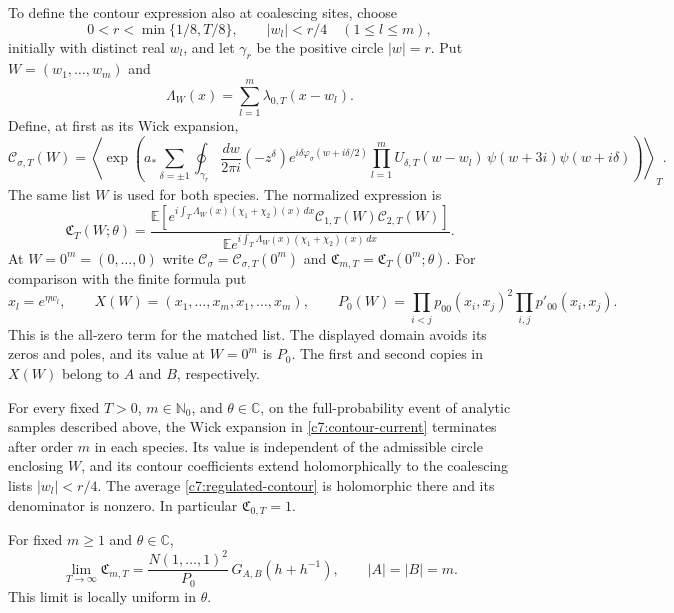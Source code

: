 To define the contour expression also at coalescing sites, choose
\[
0<r<\min\{1/8,T/8\},\qquad |w_l|<r/4\quad(1\le l\le m),
\]
initially with distinct real $w_l$, and let $\gamma_r$ be the positive circle $|w|=r$. Put $W=(w_1,\ldots,w_m)$ and
\[
\Lambda_W(x)=\sum_{l=1}^m\lambda_{0,T}(x-w_l).
\]
Define, at first as its Wick expansion,
\begin{equation}\label{c7:contour-current}
\mathcal C_{\sigma,T}(W)=
\left\langle\exp\left(
a_*\sum_{\delta=\pm1}\oint_{\gamma_r}\frac{dw}{2\pi i}
 (-z^\delta)e^{i\delta\varphi_\sigma(w+i\delta/2)}
 \prod_{l=1}^m U_{\delta,T}(w-w_l)\,
 \psi(w+3i)\psi(w+i\delta)\right)\right\rangle_T .
\end{equation}
The same list $W$ is used for both species. The normalized expression is
\begin{equation}\label{c7:regulated-contour}
\mathfrak C_T(W;\theta)=
\frac{\mathbb E\!\left[
 e^{i\int_T\Lambda_W(x)(\chi_1+\chi_2)(x)\,dx}
 \mathcal C_{1,T}(W)\mathcal C_{2,T}(W)\right]}
{\mathbb E e^{i\int_T\Lambda_W(x)(\chi_1+\chi_2)(x)\,dx}}.
\end{equation}
At $W=0^m=(0,\ldots,0)$ write $\mathcal C_\sigma=\mathcal C_{\sigma,T}(0^m)$ and $\mathfrak C_{m,T}=\mathfrak C_T(0^m;\theta)$.
For comparison with the finite formula put
\[
x_l=e^{\eta w_l},\qquad
X(W)=(x_1,\ldots,x_m,x_1,\ldots,x_m),\qquad
P_0(W)=\prod_{i<j}p_{00}(x_i,x_j)^2
       \prod_{i,j}p'_{00}(x_i,x_j).
\]
This is the all-zero term for the matched list. The displayed domain avoids its zeros and poles, and its value at $W=0^m$ is $P_0$.
The first and second copies in $X(W)$ belong to $A$ and $B$, respectively.

\begin{proposition}\label{c7:regulated-pfaffian}
For every fixed $T>0$, $m\in\mathbb N_0$, and $\theta\in\mathbb C$, on the full-probability event of analytic samples described above, the Wick expansion in \eqref{c7:contour-current} terminates after order $m$ in each species. Its value is independent of the admissible circle enclosing $W$, and its contour coefficients extend holomorphically to the coalescing lists $|w_l|<r/4$. The average \eqref{c7:regulated-contour} is holomorphic there and its denominator is nonzero. In particular $\mathfrak C_{0,T}=1$.

For fixed $m\ge1$ and $\theta\in\mathbb C$,
\begin{equation}\label{c7:regulated-limit}
\lim_{T\longrightarrow\infty}\mathfrak C_{m,T}
=\frac{N(1,\ldots,1)^2}{P_0}\,
G_{A,B}(h+h^{-1}),\qquad |A|=|B|=m.
\end{equation}
This limit is locally uniform in $\theta$.
\end{proposition}

